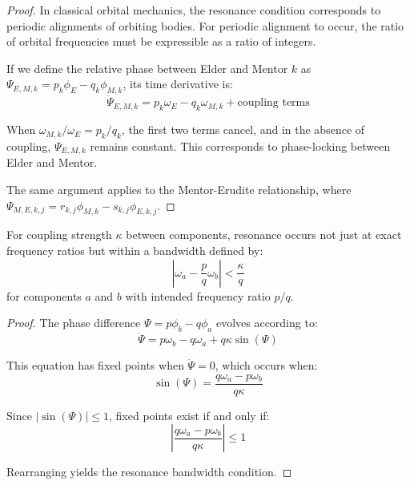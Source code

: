 \begin{proof}
In classical orbital mechanics, the resonance condition corresponds to periodic alignments of orbiting bodies. For periodic alignment to occur, the ratio of orbital frequencies must be expressible as a ratio of integers.

If we define the relative phase between Elder and Mentor $k$ as $\Psi_{E,M,k} = p_k\phi_E - q_k\phi_{M,k}$, its time derivative is:
\begin{equation}
\dot{\Psi}_{E,M,k} = p_k\omega_E - q_k\omega_{M,k} + \text{coupling terms}
\end{equation}

When $\omega_{M,k}/\omega_E = p_k/q_k$, the first two terms cancel, and in the absence of coupling, $\Psi_{E,M,k}$ remains constant. This corresponds to phase-locking between Elder and Mentor.

The same argument applies to the Mentor-Erudite relationship, where $\Psi_{M,E,k,j} = r_{k,j}\phi_{M,k} - s_{k,j}\phi_{E,k,j}$.
\end{proof}

\begin{theorem}
For coupling strength $\kappa$ between components, resonance occurs not just at exact frequency ratios but within a bandwidth defined by:
\begin{equation}
\left|\omega_a - \frac{p}{q}\omega_b\right| < \frac{\kappa}{q}
\end{equation}
for components $a$ and $b$ with intended frequency ratio $p/q$.
\end{theorem}

\begin{proof}
The phase difference $\Psi = p\phi_b - q\phi_a$ evolves according to:
\begin{equation}
\dot{\Psi} = p\omega_b - q\omega_a + q\kappa\sin(\Psi)
\end{equation}

This equation has fixed points when $\dot{\Psi} = 0$, which occurs when:
\begin{equation}
\sin(\Psi) = \frac{q\omega_a - p\omega_b}{q\kappa}
\end{equation}

Since $|\sin(\Psi)| \leq 1$, fixed points exist if and only if:
\begin{equation}
\left|\frac{q\omega_a - p\omega_b}{q\kappa}\right| \leq 1
\end{equation}

Rearranging yields the resonance bandwidth condition.
\end{proof}

